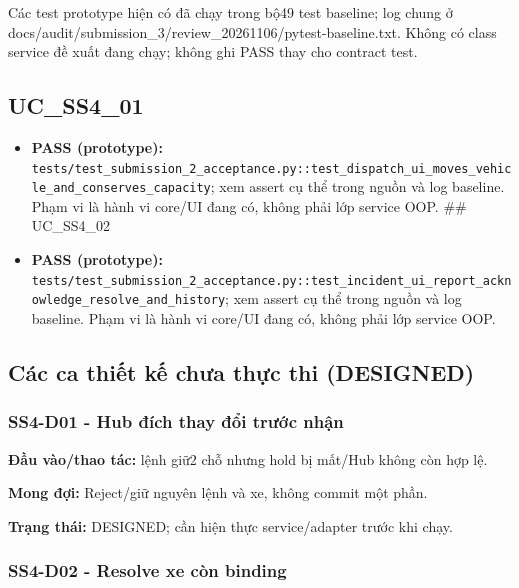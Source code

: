 \documentclass[11pt,a4paper]{article}
\begin{document}
Các test prototype hiện có đã chạy trong bộ49 test baseline; log chung ở
docs/audit/submission\_3/review\_20261106/pytest-baseline.txt. Không có
class service đề xuất đang chạy; không ghi PASS thay cho contract test.

\hypertarget{uc_ss4_01}{%
\subsection{UC\_SS4\_01}\label{uc_ss4_01}}

\begin{itemize}
\item
  \textbf{PASS (prototype):}
  \texttt{tests/test\_submission\_2\_acceptance.py::test\_dispatch\_ui\_moves\_vehicle\_and\_conserves\_capacity};
  xem assert cụ thể trong nguồn và log baseline. Phạm vi là hành vi
  core/UI đang có, không phải lớp service OOP. \#\# UC\_SS4\_02
\item
  \textbf{PASS (prototype):}
  \texttt{tests/test\_submission\_2\_acceptance.py::test\_incident\_ui\_report\_acknowledge\_resolve\_and\_history};
  xem assert cụ thể trong nguồn và log baseline. Phạm vi là hành vi
  core/UI đang có, không phải lớp service OOP.
\end{itemize}

\hypertarget{cuxe1c-ca-thiux1ebft-kux1ebf-chux1b0a-thux1ef1c-thi-designed}{%
\subsection{Các ca thiết kế chưa thực thi
(DESIGNED)}\label{cuxe1c-ca-thiux1ebft-kux1ebf-chux1b0a-thux1ef1c-thi-designed}}

\hypertarget{ss4-d01---hub-ux111uxedch-thay-ux111ux1ed5i-trux1b0ux1edbc-nhux1eadn}{%
\subsubsection{SS4-D01 - Hub đích thay đổi trước
nhận}\label{ss4-d01---hub-ux111uxedch-thay-ux111ux1ed5i-trux1b0ux1edbc-nhux1eadn}}

\textbf{Đầu vào/thao tác:} lệnh giữ2 chỗ nhưng hold bị mất/Hub không còn
hợp lệ.

\textbf{Mong đợi:} Reject/giữ nguyên lệnh và xe, không commit một phần.

\textbf{Trạng thái:} DESIGNED; cần hiện thực service/adapter trước khi
chạy.

\hypertarget{ss4-d02---resolve-xe-cuxf2n-binding}{%
\subsubsection{SS4-D02 - Resolve xe còn
binding}\label{ss4-d02---resolve-xe-cuxf2n-binding}}
\end{document}
